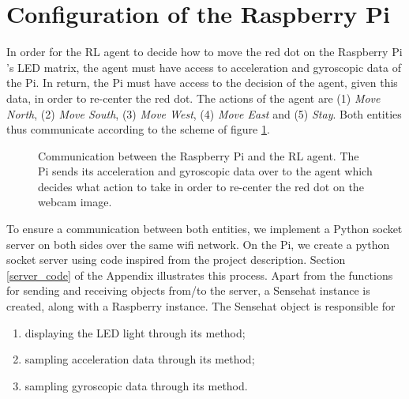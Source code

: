 \section{Configuration of the Raspberry Pi}

In order for the RL agent to decide how to move the red dot on the Raspberry Pi 's LED matrix, the agent must have access to acceleration and gyroscopic data of the Pi. In return, the Pi must have access to the decision of the agent, given this data, in order to re-center the red dot. The actions of the agent are (1) \textit{Move North}, (2) \textit{Move South}, (3) \textit{Move West}, (4) \textit{Move East} and (5) \textit{Stay}.  Both entities thus communicate according to the scheme of figure \ref{communication}.

\begin{figure}

\centering


\caption{Communication between the Raspberry Pi and the RL agent. The Pi sends its acceleration and gyroscopic data over to the agent which decides what action to take in order to re-center the red dot on the webcam image.} 
\label{communication}
\end{figure}

To ensure a communication between both entities, we implement a Python socket server on both sides over the same wifi network. On the Pi, we create a python socket server using code inspired from the project description. Section \ref{server_code} of the Appendix illustrates this process. Apart from the functions for sending and receiving objects from/to the server, a Sensehat instance is created, along with a Raspberry instance. The Sensehat object is responsible for

\begin{enumerate}
\item displaying the LED light through its \texttt{} method;
\item sampling acceleration data through its  \texttt{} method;
\item sampling gyroscopic data through its  \texttt{} method.
\end{enumerate}

